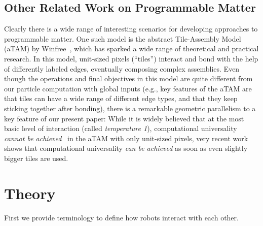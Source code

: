 \documentclass[letterpaper, 10 pt, conference]{ieeeconf}
\begin{document}
\subsection{Other Related Work on Programmable Matter}
Clearly there is a wide range of interesting scenarios for developing approaches to programmable matter.
One such model is the {abstract Tile-Assembly Model} (aTAM) by Winfree~\cite{Winf98,WLWS98,LaWiRe99}, which has 
sparked a wide range of theoretical and practical research. In this model, unit-sized pixels (``tiles'')
interact and bond with the help of differently labeled edges, eventually composing complex assemblies.
Even though the operations and final objectives in this model are quite different from our particle computation with global
inputs (e.g., key features of the aTAM are that tiles can have a wide range of different edge types, and
that they keep sticking together after bonding), there is
a remarkable geometric parallelism to a key feature of our present paper:
While it is widely believed that at the most basic level of interaction (called {\em temperature 1}),
computational universality {\em cannot be achieved}~\cite{LSAT1,ManuchTemp1,IUNeedsCoop} in the aTAM with only unit-sized pixels, 
very recent work~\cite{fhp+-ucapt-15} shows that computational universality {\em can be achieved} as soon as even slightly bigger tiles are used.

\section{Theory}\label{sec:theory}

First we provide terminology to define how robots interact with each other. 

\end{document}
